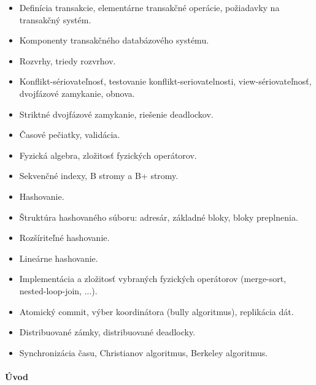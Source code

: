 \documentclass[a4paper]{report}
\begin{document}
\begin{zadanie}[Transakcie]
\begin{itemize}
 \item Definícia transakcie, elementárne transakčné operácie, požiadavky na transakčný systém.
 \item Komponenty transakčného databázového systému.
 \item Rozvrhy, triedy rozvrhov.
 \item Konflikt-sériovateľnosť, testovanie konflikt-seriovatelnosti, view-sériovateľnosť, dvojfázové zamykanie, obnova.
 \item Striktné dvojfázové zamykanie, riešenie deadlockov.
 \item Časové pečiatky, validácia.
\end{itemize}
\end{zadanie}

\begin{zadanie}
\begin{itemize}
 \item Fyzická algebra, zložitosť fyzických operátorov.
 \item Sekvenčné indexy, B stromy a B+ stromy.
 \item Hashovanie.
 \item Štruktúra hashovaného súboru: adresár, základné bloky, bloky preplnenia.
 \item Rozšíriteľné hashovanie.
 \item Lineárne hashovanie.
 \item Implementácia a zložitosť vybraných fyzických operátorov (merge-sort, nested-loop-join, ...).
\end{itemize}
\end{zadanie}

\begin{zadanie}
\begin{itemize}
 \item Atomický commit, výber koordinátora (bully algoritmus), replikácia dát.
 \item Distribuované zámky, distribuované deadlocky.
 \item Synchronizácia času, Christianov algoritmus, Berkeley algoritmus.
\end{itemize}
\end{zadanie}

\paragraph*{Úvod}
\end{document}
